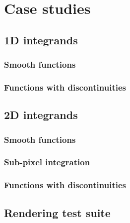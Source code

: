 \documentclass[11pt,fleqn]{book} %
\begin{document}
\chapter{Case studies}
\section{1D integrands}
\subsection{Smooth functions}
\subsection{Functions with discontinuities}
\section{2D integrands}
\subsection{Smooth functions}
\subsection{Sub-pixel integration}
\subsection{Functions with discontinuities}
\section{Rendering test suite}

% 
% 

\end{document}
